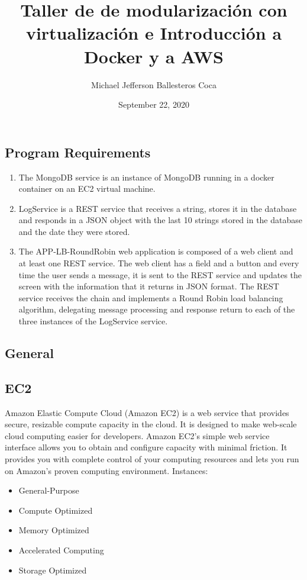 \documentclass[
	12pt, %
]{fphw}
\title{Taller de de modularización con virtualización e Introducción a Docker y a AWS} %
\author{Michael Jefferson Ballesteros Coca} %
\date{September 22, 2020} %
\institute{Escuela Colombiana de Ingeniería Julio Garavito \\ Decanatura Ingeniería de Sistemas} %
\begin{document}
\maketitle %



\subsection * {Program Requirements}

\begin {enumerate} [(a \normalfont)]%
\item The MongoDB service is an instance of MongoDB running in a docker container on an EC2 virtual machine.
\item LogService is a REST service that receives a string, stores it in the database and responds in a JSON object with the last 10 strings stored in the database and the date they were stored.
\item The APP-LB-RoundRobin web application is composed of a web client and at least one REST service. The web client has a field and a button and every time the user sends a message, it is sent to the REST service and updates the screen with the information that it returns in JSON format. The REST service receives the chain and implements a Round Robin load balancing algorithm, delegating message processing and response return to each of the three instances of the LogService service.
\end {enumerate}

\subsection * {General}

\subsection * {EC2}

Amazon Elastic Compute Cloud (Amazon EC2) is a web service that provides secure, resizable compute capacity in the cloud. It is designed to make web-scale cloud computing easier for developers. Amazon EC2’s simple web service interface allows you to obtain and configure capacity with minimal friction. It provides you with complete control of your computing resources and lets you run on Amazon’s proven computing environment. Instances:
\begin {itemize}
\item General-Purpose
\item Compute Optimized
\item Memory Optimized
\item Accelerated Computing
\item Storage Optimized
\end {itemize}
\end{document}
